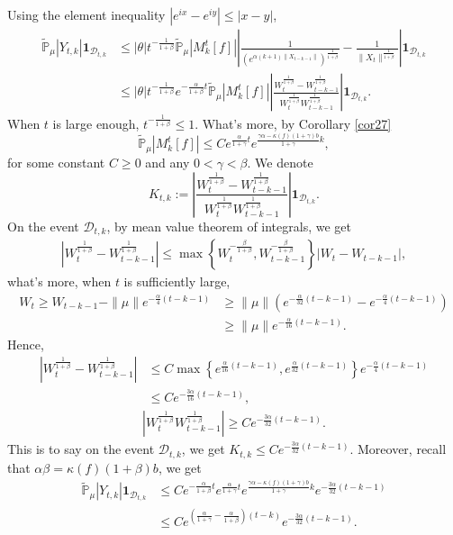 \documentclass[12pt, a4paper]{amsart}
\theoremstyle{definition}
\numberwithin{equation}{section}
\begin{document}
    Using the element inequality $|e^{ix}-e^{iy}|\leq|x-y|$,
    \begin{align*}
        \mathbb{\tilde{P}}_{\mu}|Y_{t,k}|\mathbf{1}_{\mathcal{D}_{t,k}}&\leq|\theta|t^{-\frac{1}{1+\beta}}\mathbb{\tilde{P}}_{\mu}|M_k^t[f]|\left|\frac{1}{\left(e^{\alpha(k+1)\|X_{t-k-1}\|}\right)^{\frac{1}{1+\beta}}}-\frac{1}{\|X_t\|^{\frac{1}{1+\beta}}}\right|\mathbf{1}_{\mathcal{D}_{t,k}}\\
        &\leq|\theta|t^{-\frac{1}{1+\beta}}e^{-\frac{\alpha}{1+\beta}t}\mathbb{\tilde{P}}_{\mu}|M_k^t[f]|\left|\frac{W_t^{\frac{1}{1+\beta}}-W_{t-k-1}^{\frac{1}{1+\beta}}}{W_t^{\frac{1}{1+\beta}}W_{t-k-1}^{\frac{1}{1+\beta}}}\right|\mathbf{1}_{\mathcal{D}_{t,k}}.
    \end{align*}
    When $t$ is large enough, $t^{-\frac{1}{1+\beta}}\leq 1$. What's more, by Corollary \ref{cor27}
    $$\mathbb{\tilde{P}}_{\mu}|M_k^t[f]|\leq C e^{\frac{\alpha}{1+\gamma}t}e^{\frac{\gamma \alpha-\kappa(f)(1+\gamma)b}{1+\gamma}k},$$
for some constant $C \geq 0$ and any $0<\gamma<\beta$.
We denote
$$K_{t,k}:=\left|\frac{W_t^{\frac{1}{1+\beta}}-W_{t-k-1}^{\frac{1}{1+\beta}}}{W_t^{\frac{1}{1+\beta}}W_{t-k-1}^{\frac{1}{1+\beta}}}\right|\mathbf{1}_{\mathcal{D}_{t,k}}.$$
 On the event $\mathcal{D}_{t,k}$, by mean value theorem of integrals, we get
 \begin{align*}
     \left|W_t^{\frac{1}{1+\beta}}-W_{t-k-1}^{\frac{1}{1+\beta}}\right|\leq \max \left\{W_t^{-\frac{\beta}{1+\beta}},W_{t-k-1}^{-\frac{\beta}{1+\beta}}\right\}\left|W_t-W_{t-k-1}\right|,
 \end{align*}
 what's more, when $t$ is sufficiently large,
 \begin{align*}
     W_t\geq W_{t-k-1}-\|\mu\| e^{-\frac{\alpha}{4}(t-k-1)}&\geq\|\mu\|\left(e^{-\frac{\alpha}{32}(t-k-1)}-e^{-\frac{\alpha}{4}(t-k-1)}\right)\\
     &\geq \|\mu\| e^{-\frac{\alpha}{16}(t-k-1)}.
 \end{align*}
Hence,
\begin{align*}
    \left|W_t^{\frac{1}{1+\beta}}-W_{t-k-1}^{\frac{1}{1+\beta}}\right|&\leq C \max\left\{e^{\frac{\alpha}{16}(t-k-1)}, e^{\frac{\alpha}{32}(t-k-1)}\right\}e^{-\frac{\alpha}{4}(t-k-1)}\\
    &\leq C e^{-\frac{3\alpha}{16}(t-k-1)},
\end{align*}
\begin{align*}
    \left|W_t^{\frac{1}{1+\beta}}W_{t-k-1}^{\frac{1}{1+\beta}}\right|\geq C e^{-\frac{3\alpha}{32}(t-k-1)}.
\end{align*}
This is to say on the event $\mathcal{D}_{t,k}$, we get $K_{t,k}\leq C e^{-\frac{3\alpha}{32}(t-k-1)}$. Moreover, recall that $\alpha\beta=\kappa(f)(1+\beta)b$, we get
\begin{align}
    \mathbb{\tilde{P}}_{\mu}|Y_{t,k}|\mathbf{1}_{\mathcal{D}_{t,k}}&\leq C e^{-\frac{\alpha}{1+\beta}t}e^{\frac{\alpha}{1+\gamma}t}e^{\frac{\gamma \alpha-\kappa(f)(1+\gamma)b}{1+\gamma}k}e^{-\frac{3\alpha}{32}(t-k-1)}\label{thm125}\\
    &\leq C e^{(\frac{\alpha}{1+\gamma}-\frac{\alpha}{1+\beta})(t-k)}e^{-\frac{3\alpha}{32}(t-k-1)}.\nonumber
\end{align}
\end{document}
